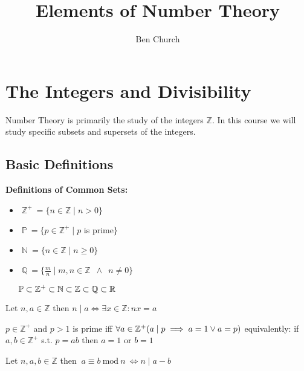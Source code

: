 \documentclass[12pt]{extarticle}
\newcommand{\divides}{\mid}
\newcommand{\Z}{\mathbb{Z}}
\newcommand{\N}{\mathbb{N}}
\newcommand{\Zplus}{\mathbb{Z}^{+}}
\newcommand{\Primes}{\mathbb{P}}
\newenvironment{definition}[1][Definition:]{\begin{trivlist}
\item[\hskip \labelsep {\bfseries #1}]}{\end{trivlist}}
\renewcommand{\mod}[3]{\: #1 \equiv #2 \: \mathrm{mod} \: #3 \:}
\begin{document}
\author{Ben Church}
\title{\Huge Elements of Number Theory}
\date{}

\maketitle
\tableofcontents
\newpage

\section{The Integers and Divisibility}
Number Theory is primarily the study of the integers $\Z$. In this course we will study specific subsets and supersets of the integers.

\subsection{Basic Definitions}

\textbf{Definitions of Common Sets:}
\begin{itemize}
\item $\> \Zplus \ = \{n \in \Z  \mid n > 0\}$
\item $\> \Primes \ = \{p \in \Zplus \mid p$ is prime$\}$
\item $\> \N \ = \{n \in \Z \mid n \ge 0\}$
\item $\> \mathbb{Q} \ = \{\frac{m}{n} \mid m,n \in \Z \enspace \wedge \enspace n \neq 0\}$
\end{itemize}

\begin{definition}[Fact:]$\indent \Primes \subset \Zplus \subset \N \subset \Z \subset \mathbb{Q} \subset \mathbb{R}$
\end{definition}

\begin{definition} Let $n,a \in \Z$ then $ n \divides a \iff \exists x \in \Z: nx = a$
\end{definition}

\begin{definition} $p \in \Zplus$ and $p > 1$ is prime iff $\forall a \in \Zplus (a \divides p \implies a = 1 \vee a = p)\\ $ \indent equivalently: if $a,b \in \Zplus$ s.t. $p = ab$ then $a = 1$ or $b = 1$
\end{definition}

\begin{definition} Let $n,a,b \in \Z$ then $\mod{a}{b}{n} \iff n \divides a-b$ 
\end{definition}
\end{document}
